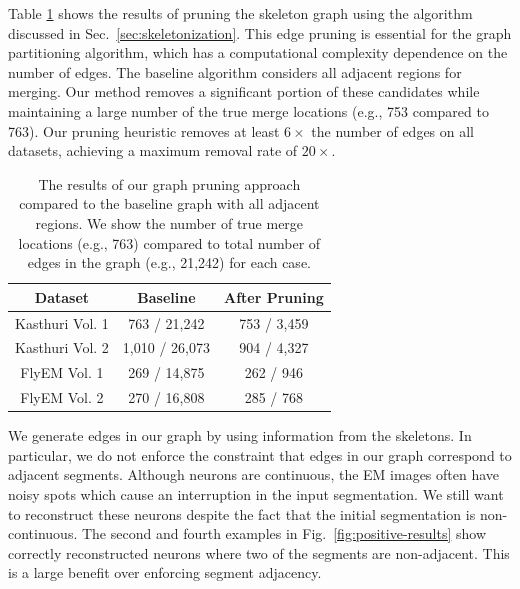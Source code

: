 Table \ref{table:skeletonization} shows the results of pruning the skeleton graph using the algorithm discussed in Sec.~\ref{sec:skeletonization}. This edge pruning is essential for the graph partitioning algorithm, which has a computational complexity dependence on the number of edges. The baseline algorithm considers all adjacent regions for merging. Our method removes a significant portion of these candidates while maintaining a large number of the true merge locations (e.g., 753 compared to 763). Our pruning heuristic removes at least $6\times$ the number of edges on all datasets, achieving a maximum removal rate of $20\times$.

\begin{table}
	\centering
	\small
	\begin{tabular}{c c c} \hline
		\textbf{Dataset} & \textbf{Baseline} & \textbf{After Pruning} \\ \hline
		Kasthuri Vol. 1 & 763 / 21,242 & 753 / 3,459 \\
		Kasthuri Vol. 2 & 1,010 / 26,073 & 904 / 4,327 \\
		FlyEM Vol. 1 & 269 / 14,875 & 262 / 946 \\
		FlyEM Vol. 2 & 270 / 16,808 & 285 / 768 \\ \hline
	\end{tabular}
	\caption{The results of our graph pruning approach compared to the baseline graph with all adjacent regions. We show the number of true merge locations (e.g., 763) compared to total number of edges in the graph (e.g., 21,242) for each case.}
	\label{table:skeletonization}
\end{table}

We generate edges in our graph by using information from the skeletons. 
In particular, we do not enforce the constraint that edges in our graph correspond to adjacent segments.
Although neurons are continuous, the EM images often have noisy spots which cause an interruption in the input segmentation.
We still want to reconstruct these neurons despite the fact that the initial segmentation is non-continuous. 
The second and fourth examples in Fig.~\ref{fig:positive-results} show correctly reconstructed neurons where two of the segments are non-adjacent. 
This is a large benefit over enforcing segment adjacency. 

